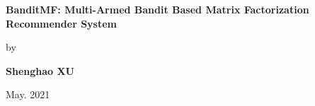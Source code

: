\begin{titlepage}
    \begin{center}
        \vspace*{1cm}
        
        \Huge
        \textbf{BanditMF: Multi-Armed Bandit Based Matrix Factorization Recommender System}
        
        \vspace{0.5cm}
        \LARGE
       
        
        \vspace{0.5cm}
        by
        
        \vspace{1.5cm}
        \textbf{Shenghao XU}\\
        
        
        \vfill
        
        

        \vspace{0.8cm}
        
        
        
        \Large
        May. 2021\\
       
        
    \end{center}
\end{titlepage}